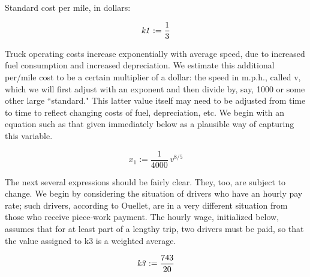 \documentclass{article}
\begin{document}
\begin{maplegroup}
Standard cost per mile, in dollars:

\begin{mapleinput}
\end{mapleinput}

\mapleresult
\begin{maplelatex}
\[
{\it k1} := {\displaystyle \frac {1}{3}}
\]
\end{maplelatex}

\end{maplegroup}
\begin{maplegroup}
Truck operating costs increase exponentially with average speed, due
to increased fuel consumption and increased depreciation. We estimate
this additional per/mile cost to be a certain multiplier of a dollar:
the speed in m.p.h., called v, which we will first adjust with an
exponent and then divide by, say, 1000 or some other large
``standard." This latter value itself may need to be adjusted from
time to time to reflect changing costs of fuel, depreciation, etc. We
begin with an equation such as that given immediately below as a
plausible way of capturing this variable.

\begin{mapleinput}
\end{mapleinput}

\mapleresult
\begin{maplelatex}
\[
{x_{1}} := {\displaystyle \frac {1}{4000}} \,v^{8/5}
\]
\end{maplelatex}

\end{maplegroup}
\begin{maplegroup}
The next several expressions should be fairly clear. They, too, are
subject to change. We begin by considering the situation of drivers
who have an hourly pay rate; such drivers, according to Ouellet, are
in a very different situation from those who receive piece-work
payment. The hourly wage, initialized below, assumes that for at least
part of a lengthy trip, two drivers must be paid, so that the value
assigned to k3 is a weighted average.

\begin{mapleinput}
\end{mapleinput}

\mapleresult
\begin{maplelatex}
\[
{\it k3} := {\displaystyle \frac {743}{20}}
\]
\end{maplelatex}

\end{maplegroup}
\end{document}

